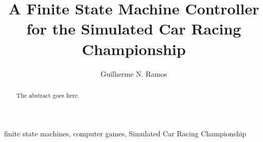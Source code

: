 \documentclass[journal]{IEEEtran}%
\begin{document}
	\title{A Finite State Machine Controller for the Simulated Car Racing Championship}

\author{Guilherme N. Ramos}%

%
{}%

\maketitle

\begin{abstract}
The abstract goes here.
\end{abstract}

\begin{IEEEkeywords}
finite state machines, computer games, Simulated Car Racing Championship
\end{IEEEkeywords}%

%
%
%
%
%

%
%
\end{document}
